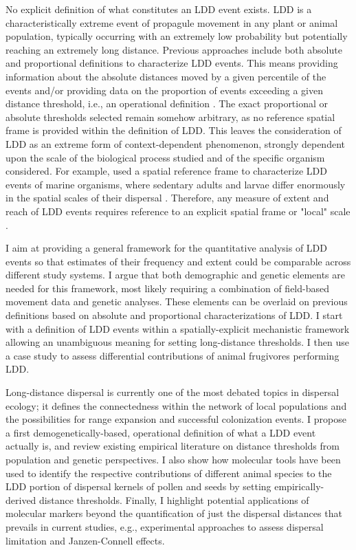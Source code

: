 \documentclass[a4paper, 12pt]{article}
\begin{document}
\begin{linenumbers}
No explicit definition of what constitutes an LDD event exists. LDD is a characteristically extreme event of propagule movement in any plant or animal population, typically occurring with an extremely low probability but potentially reaching an extremely long distance. Previous approaches \citep[e.g., ][]{Nathan:2006aa,Schurr2009long} include both absolute and proportional definitions to characterize LDD events. This means providing information about the absolute distances moved by a given percentile of the events and/or providing data on the proportion of events exceeding a given distance threshold, i.e., an operational definition \citep{Nathan:2008is}. The exact proportional or absolute thresholds selected remain somehow arbitrary, as no reference spatial frame is provided within the definition of LDD. This leaves the consideration of LDD as an extreme form of context-dependent phenomenon, strongly dependent upon the scale of the biological process studied \citep{Kinlan:2005fb} and of the specific organism considered. For example, \cite{Kinlan:2005fb} used a spatial reference frame to characterize LDD events of marine organisms, where sedentary adults and larvae differ enormously in the spatial scales of their dispersal \citep{DAloia:2013fc}. Therefore, any measure of extent and reach of LDD events requires reference to an explicit spatial frame or "local" scale \citep{Kinlan:2005fb,Byrne:2014gu}.

I aim at providing a general framework for the quantitative analysis of LDD events so that estimates of their frequency and extent could be comparable across different study systems. I argue that both demographic and genetic elements are needed for this framework, most likely requiring a combination of field-based movement data and genetic analyses. These elements can be overlaid on previous definitions based on absolute and proportional characterizations of LDD. I start with a definition of LDD events within a spatially-explicit mechanistic framework allowing an unambiguous meaning for setting long-distance thresholds. I then use a case study to assess differential contributions of animal frugivores performing LDD.

Long-distance dispersal is currently one of the most debated topics in dispersal ecology; it defines the connectedness within the network of local populations and the possibilities for range expansion and successful colonization events. I propose a first demogenetically-based, operational definition of what a LDD event actually is, and review existing empirical literature on distance thresholds from population and genetic perspectives. I also show how molecular tools have been used to identify the respective contributions of different animal species to the LDD portion of dispersal kernels of pollen and seeds by setting empirically-derived distance thresholds. Finally, I highlight potential applications of molecular markers beyond the quantification of just the dispersal distances that prevails in current studies, e.g., experimental approaches to assess dispersal limitation and Janzen-Connell effects.



\end{linenumbers}
\end{document}
